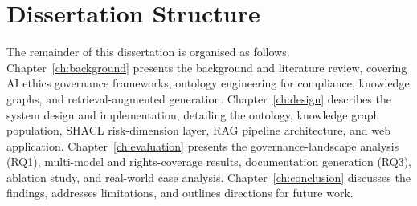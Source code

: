 \section{Dissertation Structure}

The remainder of this dissertation is organised as follows. Chapter~\ref{ch:background} presents the background and literature review, covering AI ethics governance frameworks, ontology engineering for compliance, knowledge graphs, and retrieval-augmented generation. Chapter~\ref{ch:design} describes the system design and implementation, detailing the ontology, knowledge graph population, SHACL risk-dimension layer, RAG pipeline architecture, and web application. Chapter~\ref{ch:evaluation} presents the governance-landscape analysis (RQ1), multi-model and rights-coverage results, documentation generation (RQ3), ablation study, and real-world case analysis. Chapter~\ref{ch:conclusion} discusses the findings, addresses limitations, and outlines directions for future work.

